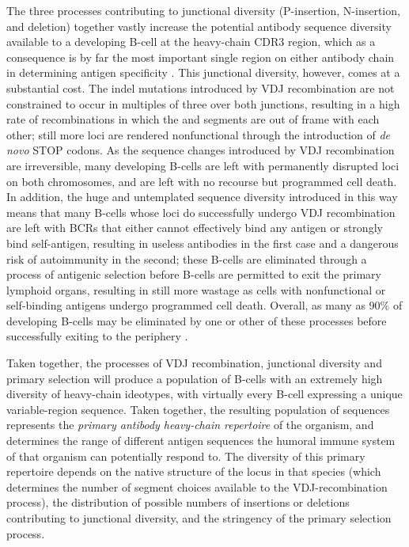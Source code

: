 The three processes contributing to junctional diversity (P-insertion, N-insertion, and deletion) together vastly increase the potential antibody sequence diversity available to a developing B-cell at the heavy-chain CDR3 region, which as a consequence is by far the most important single region on either antibody chain in determining antigen specificity \parencite{shirai1999h3}. This junctional diversity, however, comes at a substantial cost. The indel mutations introduced by VDJ recombination are not constrained to occur in multiples of three over both junctions, resulting in a high rate of recombinations in which the \vh and \jh segments are out of frame with each other; still more loci are rendered nonfunctional through the introduction of \textit{de novo} STOP codons. As the sequence changes introduced by VDJ recombination are irreversible, many developing B-cells are left with permanently disrupted \igh{} loci on both chromosomes, and are left with no recourse but programmed cell death. In addition, the huge and untemplated sequence diversity introduced in this way means that many B-cells whose \igh{} loci do successfully undergo VDJ recombination are left with BCRs that either cannot effectively bind any antigen or strongly bind self-antigen, resulting in useless antibodies in the first case and a dangerous risk of autoimmunity in the second; these B-cells are eliminated through a process of antigenic selection before \naive B-cells are permitted to exit the primary lymphoid organs, resulting in still more wastage as cells with nonfunctional or self-binding antigens undergo programmed cell death. Overall, as many as 90\% of developing B-cells may be eliminated by one or other of these processes before successfully exiting to the periphery \parencite{kogut2012bcells}.  


Taken together, the processes of VDJ recombination, junctional diversity and primary selection will produce a population of \naive B-cells with an extremely high diversity of heavy-chain ideotypes, with virtually every \naive B-cell expressing a unique variable-region sequence. Taken together, the resulting population of sequences represents the \textit{primary antibody heavy-chain repertoire} of the organism, and determines the range of different antigen sequences the humoral immune system of that organism can potentially respond to. The diversity of this primary repertoire depends on the native structure of the \igh{} locus in that species (which determines the number of segment choices available to the VDJ-recombination process), the distribution of possible numbers of insertions or deletions contributing to junctional diversity, and the stringency of the primary selection process.

